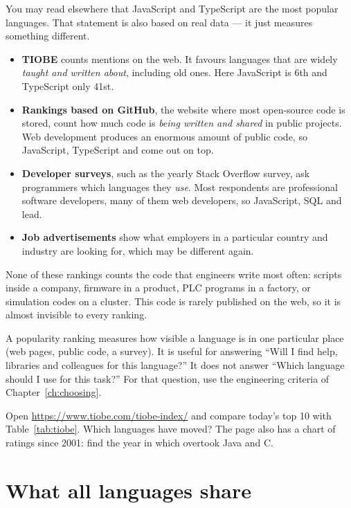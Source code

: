You may read elsewhere that JavaScript and TypeScript are the most popular languages. That
statement is also based on real data --- it just measures something different.
\begin{itemize}
\item \textbf{TIOBE} counts mentions on the web. It favours languages that are widely
  \emph{taught and written about}, including old ones. Here JavaScript is 6th and
  TypeScript only 41st.
\item \textbf{Rankings based on GitHub}, the website where most open-source code is
  stored, count how much code is \emph{being written and shared} in public projects.
  Web development produces an enormous amount of public code, so JavaScript, TypeScript
  and \py come out on top.
\item \textbf{Developer surveys}, such as the yearly Stack Overflow survey, ask
  programmers which languages they \emph{use}. Most respondents are professional software
  developers, many of them web developers, so JavaScript, SQL and \py lead.
\item \textbf{Job advertisements} show what employers in a particular country and
  industry are looking for, which may be different again.
\end{itemize}
None of these rankings counts the code that engineers write most often: scripts inside a
company, firmware in a product, PLC programs in a factory, or simulation codes on a
cluster. This code is rarely published on the web, so it is almost invisible to every
ranking.

\begin{keyidea}
A popularity ranking measures how visible a language is in one particular place (web
pages, public code, a survey). It is useful for answering ``Will I find help, libraries
and colleagues for this language?'' It does not answer ``Which language should I use for
this task?'' For that question, use the engineering criteria of
Chapter~\ref{ch:choosing}.
\end{keyidea}

\begin{tryit}
Open \url{https://www.tiobe.com/tiobe-index/} and compare today's top 10 with
Table~\ref{tab:tiobe}. Which languages have moved? The page also has a chart of ratings
since 2001: find the year in which \py overtook Java and C.
\end{tryit}

\section{What all languages share}

